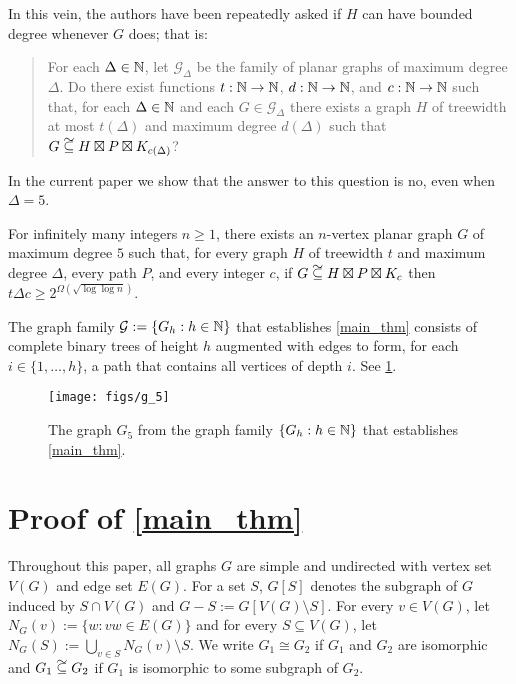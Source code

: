 \documentclass{patmorin}
\newcommand\subsetcong{\mathrel{\text{%
    \setbox0\hbox{$\subseteq$}%
    \rlap{\hbox to \wd0{\hss\hss\hss\raisebox{1.5\height}{$\sim$}\hss}}\box0
}}}
\renewcommand{\ge}{\geqslant}
\begin{document}
In this vein, the authors have been repeatedly asked if $H$ can have bounded degree whenever $G$ does; that is:
\begin{quote}
  For each $\Delta\in\mathbb{N}$, let $\mathcal{G}_\Delta$ be the family of planar graphs of maximum degree $\Delta$.  Do there exist functions $t:\mathbb{N}\to\mathbb{N}$, $d:\mathbb{N}\to\mathbb{N}$, and $c:\mathbb{N}\to\mathbb{N}$ such that, for each $\Delta\in\mathbb{N}$ and each $G\in\mathcal{G}_\Delta$ there exists a graph $H$ of treewidth at most $t(\Delta)$ and maximum degree $d(\Delta)$ such that $G\subsetcong H\boxtimes P\boxtimes K_{c(\Delta)}$?
\end{quote}
In the current paper we show that the answer to this question is no, even when $\Delta=5$.

\begin{thm}\label{main_thm}
  For infinitely many integers $n\ge 1$, there exists an $n$-vertex planar graph $G$ of maximum degree $5$ such that, for every graph $H$ of treewidth $t$ and maximum degree $\Delta$, every path $P$, and every integer $c$, if $G\subsetcong H\boxtimes P\boxtimes K_c$ then $t\Delta c \ge 2^{\Omega(\sqrt{\log\log n})}$.
\end{thm}

The graph family $\mathcal{G}:=\{G_h:h\in\mathbb{N}\}$ that establishes \cref{main_thm} consists of complete binary trees of height $h$ augmented with edges to form, for each $i\in\{1,\ldots,h\}$, a path that contains all vertices of depth $i$.  See \cref{G_5}.

\begin{figure}
  \begin{center}
    \texttt{[image: figs/g\_5]}
  \end{center}
  \caption{The graph $G_5$ from the graph family $\{G_h:h\in\mathbb{N}\}$ that establishes \cref{main_thm}.}
  \label{G_5}
\end{figure}

\section{Proof of \cref{main_thm}}

Throughout this paper, all graphs $G$ are simple and undirected with vertex set $V(G)$ and edge set $E(G)$.  For a set $S$, $G[S]$ denotes the subgraph of $G$ induced by $S\cap V(G)$ and $G-S:=G[V(G)\setminus S]$.  For every $v\in V(G)$, let $N_G(v):=\{w:vw\in E(G)\}$ and for every $S\subseteq V(G)$, let $N_G(S):=\bigcup_{v\in S} N_G(v)\setminus S$.  We write $G_1\cong G_2$ if $G_1$ and $G_2$ are isomorphic and $G_1\subsetcong G_2$ if $G_1$ is isomorphic to some subgraph of $G_2$.
\end{document}
